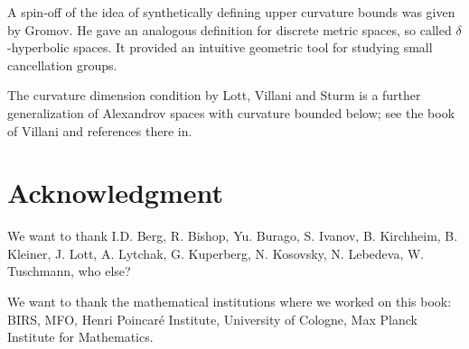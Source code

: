 A spin-off of the idea of synthetically defining upper curvature bounds 
was given by Gromov. 
He gave an analogous definition for discrete metric spaces, so called $\delta$-hyperbolic spaces. 
It provided an intuitive geometric tool for studying small cancellation groups.

The curvature dimension condition by Lott, Villani and Sturm is a further generalization of Alexandrov spaces with curvature bounded below; see the book of Villani \cite{villani} and references there
in.

\section*{Acknowledgment}
We want to thank 
I.D. Berg,
R. Bishop, 
Yu. Burago, 
S. Ivanov,
B. Kirchheim, 
B. Kleiner, 
J. Lott,
A. Lytchak, 
G. Kuperberg, 
N. Kosovsky, 
N. Lebedeva, 
W. Tuschmann,
who else?


We want to thank the mathematical institutions where we worked on this book:
BIRS, 
MFO, 
Henri Poincar\'{e} Institute,
University of Cologne, 
Max Planck Institute for Mathematics.



